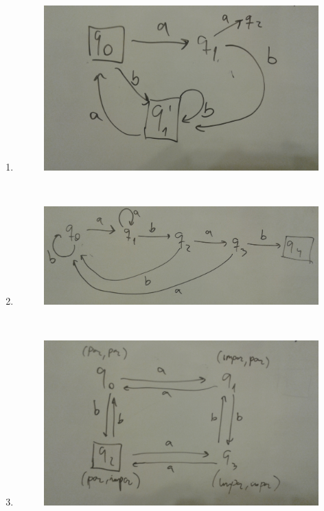 \documentclass[twoside]{article}
\begin{document}
\begin{solucion}\
\begin{enumerate}
\item 

\begin{figure}[h!]
\includegraphics[scale=0.1]{Automatas/1-1}
\end{figure}\

\newpage

\item

 \begin{figure}[h!]
\includegraphics[scale=0.1]{Automatas/1-2}
\end{figure}\

\item 

\begin{figure}[h!]
\includegraphics[scale=0.1]{Automatas/1-3}
\end{figure}\


\end{enumerate}
\end{solucion}
\end{document}
